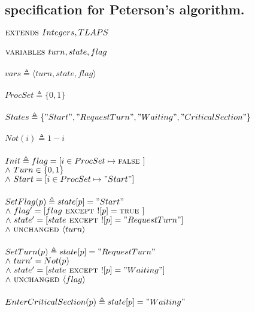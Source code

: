 \documentclass[fleqn]{tukseminar}
\begin{document}
			\subsection*{\tla specification for Peterson's algorithm.} \label{petersonspec}
			$\mbox{\textsc{extends }} Integers, TLAPS$\\\\
			$\mbox{\textsc{variables }} turn, state, flag$\\\\
			$vars \triangleq  \langle turn, state, flag \rangle$\\\\
			$ProcSet \triangleq \{0,1\} $\\\\
			$States \triangleq \{"Start", "RequestTurn", "Waiting", "CriticalSection"\} $\\\\
			$Not(i) \triangleq 1-i $\\\\
			$ Init \triangleq flag = [i \in ProcSet \mapsto \mbox{\textsc{false }}]$ \\
			\hspace*{0.8cm}$\land \  Turn \in \{0,1\}$\\
			\hspace*{0.8cm}$\land \   Start =  [i \in ProcSet \mapsto "Start"]$\\\\
			$ SetFlag(p) \triangleq state[p] = "Start"$ \\
			\hspace*{0.8cm}$\land \  flag' = [flag \mbox{\textsc{ except }} ![p] = \mbox{\textsc{true }}]$\\
			\hspace*{0.8cm}$\land \   state' = [state \mbox{\textsc{ except }} ![p] = "RequestTurn"]$\\
			\hspace*{0.8cm}$\land \  \mbox{\textsc{unchanged }} \langle turn \rangle $\\\\
			$ SetTurn(p) \triangleq state[p] = "RequestTurn"$ \\
			\hspace*{0.8cm}$\land \  turn' = Not(p)$\\
			\hspace*{0.8cm}$\land \   state' = [state \mbox{\textsc{ except }} ![p] = "Waiting"]$\\
			\hspace*{0.8cm}$\land \  \mbox{\textsc{unchanged }} \langle flag \rangle $\\\\
			$ EnterCriticalSection(p) \triangleq state[p] = "Waiting"$ \\
\end{document}
